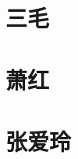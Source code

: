\documentclass[12pt,utf8]{book}
\begin{document}
\chapter{三毛}




\clearpage

% 
% 



\clearpage


\chapter{萧红}



% 






\chapter{张爱玲}











\end{document}
